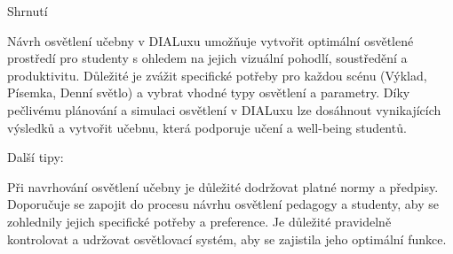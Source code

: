 

\sec Shrnutí

Návrh osvětlení učebny v DIALuxu umožňuje vytvořit optimální osvětlené prostředí pro studenty s ohledem na jejich
vizuální pohodlí, soustředění a produktivitu. Důležité je zvážit specifické potřeby pro každou scénu
(Výklad, Písemka, Denní světlo) a vybrat vhodné typy osvětlení a parametry. Díky pečlivému plánování
a simulaci osvětlení v DIALuxu lze dosáhnout vynikajících výsledků a vytvořit učebnu, která podporuje učení a well-being studentů.

Další tipy:

Při navrhování osvětlení učebny je důležité dodržovat platné normy a předpisy.
Doporučuje se zapojit do procesu návrhu osvětlení pedagogy a studenty, aby se zohlednily jejich specifické potřeby a preference.
Je důležité pravidelně kontrolovat a udržovat osvětlovací systém, aby se zajistila jeho optimální funkce.